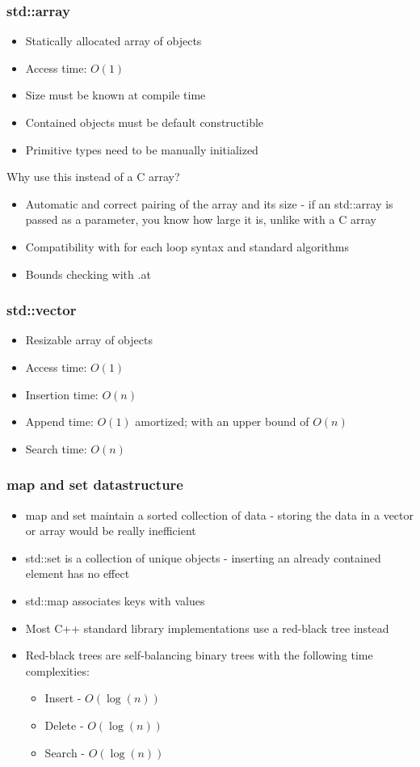 \documentclass{beamer}
\begin{document}
\begin{frame}
  \frametitle{std::array}
  \begin{itemize}
  \item Statically allocated array of objects
  \item Access time: $O(1)$
  \item Size must be known at compile time
  \item Contained objects must be default constructible
  \item Primitive types need to be manually initialized
  \end{itemize}
  Why use this instead of a C array?
  \begin{itemize}
  \item Automatic and correct pairing of the array and its size
    - if an std::array is passed as a parameter, you know how large it is, unlike with a C array
  \item Compatibility with for each loop syntax and standard algorithms
  \item Bounds checking with .at
  \end{itemize}
\end{frame}

\begin{frame}
  \frametitle{std::vector}
  \begin{itemize}
  \item Resizable array of objects
  \item Access time: $O(1)$
  \item Insertion time: $O(n)$
  \item Append time: $O(1)$ amortized; with an upper bound of $O(n)$
  \item Search time: $O(n)$
  \end{itemize}
\end{frame}

\begin{frame}
  \frametitle{map and set datastructure}
  \begin{itemize}
  \item map and set maintain a sorted collection of data
    - storing the data in a vector or array would be really inefficient
  \item std::set is a collection of unique objects - inserting an already contained element has no effect
  \item std::map associates keys with values
  \item Most C++ standard library implementations use a red-black tree instead
  \item Red-black trees are self-balancing binary trees with the following time complexities:
    \begin{itemize}
    \item Insert - $O(\log(n))$
    \item Delete - $O(\log(n))$
    \item Search - $O(\log(n))$
    \end{itemize}
  \end{itemize}
\end{frame}
\end{document}
